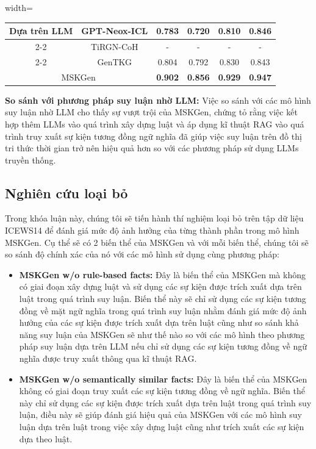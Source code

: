 \begin{table}
\begin{adjustbox}{width=\textwidth}
\begin{tabular}{|cc|cccc|}
\multicolumn{1}{|c|}{\multirow{3}{*}{Dựa trên LLM}}    & GPT-Neox-ICL             & 0.783                    & 0.720                      & 0.810                      & 0.846          \\ \cline{2-2}
\multicolumn{1}{|c|}{}                                 & TiRGN-CoH                & -                        & -                          & -                          & -              \\ \cline{2-2}
\multicolumn{1}{|c|}{}                                 & GenTKG                   & 0.804                    & 0.792                      & 0.830                      & 0.843          \\ \hline
\multicolumn{2}{|c|}{MSKGen}                                                      & \textbf{0.902}           & \textbf{0.856}             & \textbf{0.929}             & \textbf{0.947} \\ \hline
\end{tabular}
\end{adjustbox}  
\end{table}

\textbf{So sánh với phương pháp suy luận nhờ LLM:} Việc so sánh với các mô hình suy luận nhờ LLM cho thấy sự vượt trội của MSKGen, chứng
tỏ rằng việc kết hợp thêm LLMs vào quá trình xây dựng luật và áp dụng kĩ thuật RAG vào quá trình truy xuất sự kiện tương đồng ngữ nghĩa đã giúp việc suy luận
trên đồ thị tri thức thời gian trở nên hiệu quả hơn so với các phương pháp sử dụng LLMs truyền thống.
\subsection{Nghiên cứu loại bỏ}

Trong khóa luận này, chúng tôi sẽ tiến hành thí nghiệm loại bỏ trên tập dữ liệu ICEWS14 để đánh giá mức độ ảnh hưởng của từng thành phần trong mô hình MSKGen. Cụ thể
sẽ có 2 biến thể của MSKGen và với mỗi biến thể, chúng tôi sẽ so sánh độ chính xác của nó với các mô hình sử dụng cùng phương pháp:
\begin{itemize}
    \item \textbf{MSKGen w/o rule-based facts:} Đây là biến thể của MSKGen mà không có giai đoạn xây dựng luật và sử dụng các sự kiện được
    trích xuất dựa trên luật trong quá trình suy luận. Biến thể này sẽ chỉ sử dụng các sự kiện tương đồng về mặt ngữ nghĩa trong quá trình 
    suy luận nhằm đánh giá mức độ ảnh hưởng của các sự kiện được trích xuất dựa trên luật cũng như so sánh khả năng suy luận của MSKGen sẽ như thế 
    nào so với các mô hình theo phương pháp suy luận dựa trên LLM nếu chỉ sử dụng các sự kiện tương đồng về ngữ nghĩa được truy xuất thông qua kĩ thuật RAG.
    \item \textbf{MSKGen w/o semantically similar facts:} Đây là biến thể của MSKGen không có giai đoạn truy xuất các sự kiện tương đồng về ngữ nghĩa.
    Biến thể này chỉ sử dụng các sự kiện được trích xuất dựa trên luật trong quá trình suy luận, điều này sẽ giúp đánh giá hiệu quả của MSKGen
    với các mô hình suy luận dựa trên luật trong việc xây dựng luật cũng như trích xuất các sự kiện dựa theo luật.
\end{itemize}

